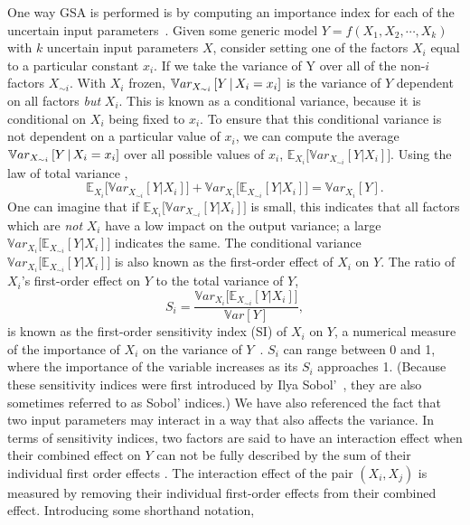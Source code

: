 One way GSA is performed is by computing an importance index for each of the uncertain input parameters~\cite{sobol}. Given some generic model $Y=f(X_1,X_2,\cdots,X_k)$ with $k$ uncertain input parameters $X$, consider setting one of the factors $X_i$ equal to a particular constant $x_i$. If we take the variance of Y over all of the non-$i$ factors $X_{\sim i}$. With $X_i$ frozen, $\mathbb{V}ar_{X_{\sim i}}\left[ Y \, | \, X_i = x_i \right]$ is the variance of $Y$ dependent on all factors \textit{but} $X_i$. This is known as a conditional variance, because it is conditional on $X_i$ being fixed to $x_i$. To ensure that this conditional variance is not dependent on a particular value of $x_i$, we can compute the average $\mathbb{V}ar_{X_{\sim i}}\left[ Y \, | \, X_i = x_i \right]$ over all possible values of $x_i$, $\mathbb{E}_{X_i}\big[ \mathbb{V}ar_{X_{\sim i}}\left[ Y | X_i\right]\big]$. Using the law of total variance \cite{saltelliGSA},
\begin{equation}
    \mathbb{E}_{X_i}\big[ \mathbb{V}ar_{X_{\sim i}}\left[ Y | X_i \right] \big] + 
    \mathbb{V}ar_{X_i}\big[  \mathbb{E}_{X_{\sim i}}\left[ Y | X_i \right] \big] = \mathbb{V}ar_{X_i}\left[Y\right] .
\end{equation}
One can imagine that if $\mathbb{E}_{X_i}\big[ \mathbb{V}ar_{X_{\sim i}}\left[ Y | X_i \right] \big]$ is small, this indicates that all factors which are \textit{not} $X_i$ have a low impact on the output variance; a large $\mathbb{V}ar_{X_i}\big[  \mathbb{E}_{X_{\sim i}}\left[ Y | X_i \right] \big]$ indicates the same. The conditional variance $\mathbb{V}ar_{X_i}\big[  \mathbb{E}_{X_{\sim i}}\left[ Y | X_i \right] \big]$ is also known as the first-order effect of $X_i$ on $Y$. The ratio of $X_i$'s first-order effect on $Y$ to the total variance of $Y$,
\begin{equation}\label{eq:first-order-si}
    S_i = \frac{\mathbb{V}ar_{X_i}\big[  \mathbb{E}_{X_{\sim i}}\left[ Y | X_i \right] \big]}{\mathbb{V}ar\left[Y\right]} ,
\end{equation}
is known as the first-order sensitivity index (SI) of $X_i$ on $Y$, a numerical measure of the importance of $X_i$ on the variance of $Y$~\cite{saltelliGSA}.  $S_i$ can range between 0 and 1, where the importance of the variable increases as its $S_i$ approaches 1. (Because these sensitivity indices were first introduced by Ilya Sobol'~\cite{sobol}, they are also sometimes referred to as Sobol' indices.)
We have also referenced the fact that two input parameters may interact in a way that also affects the variance. In terms of sensitivity indices, two factors are said to have an interaction effect when their combined effect on $Y$ can not be fully described by the sum of their individual first order effects \cite{saltelliGSA}. The interaction effect of the pair $(X_i,X_j)$ is measured by removing their individual first-order effects from their combined effect. Introducing some shorthand notation,
